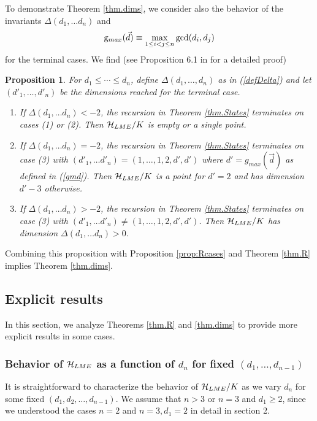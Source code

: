\documentclass[12pt]{article}
\newtheorem{proposition}[theorem]{Proposition}
\theoremstyle{definition}
\newcommand{\be}{\begin{equation}}
\newcommand{\ee}{\end{equation}}
\begin{document}
To demonstrate Theorem \ref{thm.dims}, we consider also the behavior of the invariants $\Delta(d_1, \dots d_n)$ and
\be
\label{gmd2}
{\rm g}_{max}(\vec{d}) \equiv \max_{1 \le i < j \le n} \gcd(d_i,d_j)
\ee
for the terminal cases. We find (see Proposition 6.1 in \cite{mathpaper} for a detailed proof)
\begin{proposition} \label{prop.terminal}
For $d_1 \le \cdots \le d_n$, define $\Delta(d_1, \dots, d_n)$ as in (\ref{defDelta}) and let $(d'_1, \dots, d'_n)$ be the dimensions reached for the terminal case.
\begin{enumerate}
\item
If $\Delta(d_1, \dots d_n) < -2$, the recursion in Theorem \ref{thm.States} terminates on cases (1) or (2). Then ${\cal H}_{LME}/K$ is empty or a single point.
\item
If $\Delta(d_1, \dots d_n) = -2$, the recursion in Theorem \ref{thm.States} terminates on case (3) with $(d'_1, \dots d'_n) = (1,\dots,1,2,d',d')$ where $d' = g_{max}(\vec{d})$ as defined in (\ref{gmd}). Then ${\cal H}_{LME}/K$ is a point for $d'=2$ and has dimension $d'-3$ otherwise.
\item
If $\Delta(d_1, \dots d_n) > -2$, the recursion in Theorem \ref{thm.States} terminates on case (3) with $(d'_1, \dots d'_n) \ne (1,\dots,1,2,d',d')$. Then ${\cal H}_{LME}/K$ has dimension $\Delta(d_1, \dots d_n) > 0$.
\end{enumerate}
\end{proposition}
Combining this proposition with Proposition \ref{prop:Rcases} and Theorem \ref{thm.R} implies Theorem \ref{thm.dims}.

\subsection{Explicit results}

In this section, we analyze Theorems \ref{thm.R} and \ref{thm.dims} to provide more explicit results in some cases.

\subsubsection*{Behavior of ${\cal H}_{LME}$ as a function of $d_n$ for fixed $(d_1, \dots, d_{n-1})$}

It is straightforward to characterize the behavior of ${\cal H}_{LME}/K$ as we vary $d_n$ for some fixed $(d_1,d_2,\dots,d_{n-1})$. We assume that $n > 3$ or $n=3$ and $d_1 \ge 2$, since we understood the cases $n=2$ and $n=3, d_1=2$ in detail in section 2.
\end{document}
